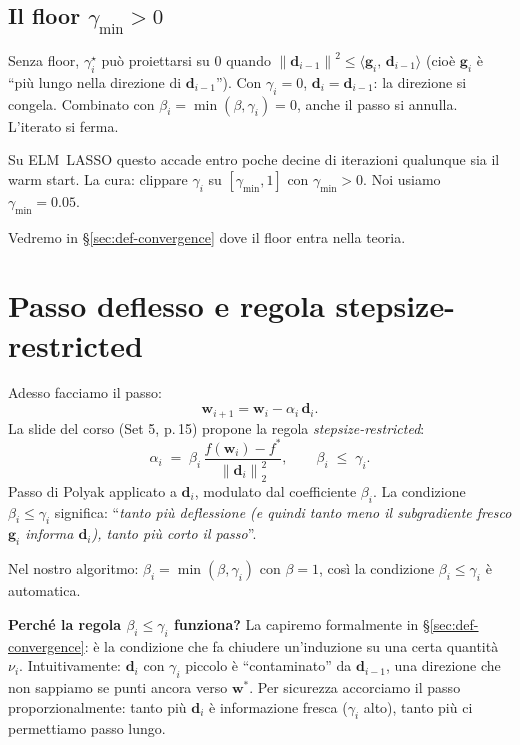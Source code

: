 \documentclass[11pt,a4paper]{article}
\newcommand{\norm}[1]{\left\|#1\right\|}
\newcommand{\inner}[2]{\langle #1,\,#2\rangle}
\newcommand{\bw}{\mathbf{w}}
\newcommand{\bg}{\mathbf{g}}
\newcommand{\bd}{\mathbf{d}}
\theoremstyle{definition}
\begin{document}
\subsection{Il floor $\gamma_{\min}>0$}

\begin{tcolorbox}[intuition]
Senza floor, $\gamma_i^\star$ può proiettarsi su $0$ quando $\norm{\bd_{i-1}}^2 \le \inner{\bg_i}{\bd_{i-1}}$ (cioè $\bg_i$ è ``più lungo nella direzione di $\bd_{i-1}$''). Con $\gamma_i=0$, $\bd_i = \bd_{i-1}$: la direzione si congela. Combinato con $\beta_i = \min(\beta,\gamma_i) = 0$, anche il passo si annulla. L'iterato si ferma.

Su ELM~LASSO questo accade entro poche decine di iterazioni qualunque sia il warm start. La cura: clippare $\gamma_i$ su $[\gamma_{\min}, 1]$ con $\gamma_{\min}>0$. Noi usiamo $\gamma_{\min}=0.05$.
\end{tcolorbox}

Vedremo in \S\ref{sec:def-convergence} dove il floor entra nella teoria.

\section{Passo deflesso e regola stepsize-restricted}
\label{sec:sr-rule}

Adesso facciamo il passo:
\[
\bw_{i+1} = \bw_i - \alpha_i\,\bd_i.
\]
La slide del corso (Set 5, p.\,15) propone la regola \emph{stepsize-restricted}:
\begin{equation}
\label{eq:sr}
\boxed{\;\;\alpha_i \;=\; \beta_i\,\frac{f(\bw_i) - f^*}{\norm{\bd_i}_2^2},\qquad \beta_i \;\le\; \gamma_i.\;\;}
\end{equation}
Passo di Polyak applicato a $\bd_i$, modulato dal coefficiente $\beta_i$. La condizione $\beta_i\le\gamma_i$ significa: ``\emph{tanto più deflessione (e quindi tanto meno il subgradiente fresco $\bg_i$ informa $\bd_i$), tanto più corto il passo}''.

Nel nostro algoritmo: $\beta_i = \min(\beta, \gamma_i)$ con $\beta=1$, così la condizione $\beta_i\le\gamma_i$ è automatica.

\begin{tcolorbox}[intuition]
\textbf{Perché la regola $\beta_i\le\gamma_i$ funziona?} La capiremo formalmente in \S\ref{sec:def-convergence}: è la condizione che fa chiudere un'induzione su una certa quantità $\nu_i$. Intuitivamente: $\bd_i$ con $\gamma_i$ piccolo è ``contaminato'' da $\bd_{i-1}$, una direzione che non sappiamo se punti ancora verso $\bw^*$. Per sicurezza accorciamo il passo proporzionalmente: tanto più $\bd_i$ è informazione fresca ($\gamma_i$ alto), tanto più ci permettiamo passo lungo.
\end{tcolorbox}
\end{document}
